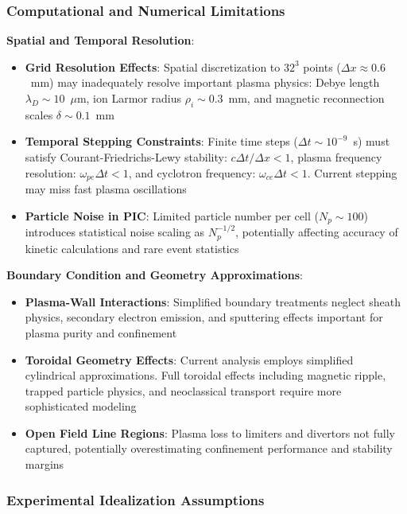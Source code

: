 \documentclass[12pt,a4paper]{article}
\begin{document}
\subsubsection{Computational and Numerical Limitations}

\textbf{Spatial and Temporal Resolution}:
\begin{itemize}
\item \textbf{Grid Resolution Effects}: Spatial discretization to $32^3$ points ($\Delta x \approx 0.6$~mm) may inadequately resolve important plasma physics: Debye length $\lambda_D \sim 10$~$\mu$m, ion Larmor radius $\rho_i \sim 0.3$~mm, and magnetic reconnection scales $\delta \sim 0.1$~mm
\item \textbf{Temporal Stepping Constraints}: Finite time steps ($\Delta t \sim 10^{-9}$~s) must satisfy Courant-Friedrichs-Lewy stability: $c\Delta t/\Delta x < 1$, plasma frequency resolution: $\omega_{pe}\Delta t < 1$, and cyclotron frequency: $\omega_{ce}\Delta t < 1$. Current stepping may miss fast plasma oscillations
\item \textbf{Particle Noise in PIC}: Limited particle number per cell ($N_p \sim 100$) introduces statistical noise scaling as $N_p^{-1/2}$, potentially affecting accuracy of kinetic calculations and rare event statistics
\end{itemize}

\textbf{Boundary Condition and Geometry Approximations}:
\begin{itemize}
\item \textbf{Plasma-Wall Interactions}: Simplified boundary treatments neglect sheath physics, secondary electron emission, and sputtering effects important for plasma purity and confinement
\item \textbf{Toroidal Geometry Effects}: Current analysis employs simplified cylindrical approximations. Full toroidal effects including magnetic ripple, trapped particle physics, and neoclassical transport require more sophisticated modeling
\item \textbf{Open Field Line Regions}: Plasma loss to limiters and divertors not fully captured, potentially overestimating confinement performance and stability margins
\end{itemize}

\subsubsection{Experimental Idealization Assumptions}
\end{document}
